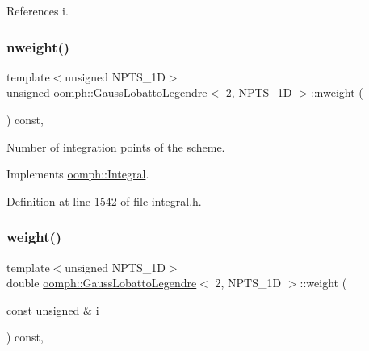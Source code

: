 References i.

\mbox{\label{classoomph_1_1GaussLobattoLegendre_3_012_00_01NPTS__1D_01_4_a1d7de3fd70cc8684195a2d7de253eb69}} 
\subsubsection{\texorpdfstring{nweight()}{nweight()}}
{\footnotesize\ttfamily template$<$unsigned N\+P\+T\+S\+\_\+1D$>$ \\
unsigned \hyperlink{classoomph_1_1GaussLobattoLegendre}{oomph\+::\+Gauss\+Lobatto\+Legendre}$<$ 2, N\+P\+T\+S\+\_\+1D $>$\+::nweight (\begin{DoxyParamCaption}{ }\end{DoxyParamCaption}) const\hspace{0.3cm}{\ttfamily [inline]}, {\ttfamily [virtual]}}



Number of integration points of the scheme. 



Implements \hyperlink{classoomph_1_1Integral_a1a270de9d99a1fcf1d25a6c1017f65fa}{oomph\+::\+Integral}.



Definition at line 1542 of file integral.\+h.

\mbox{\label{classoomph_1_1GaussLobattoLegendre_3_012_00_01NPTS__1D_01_4_a61eb3f22e13ab35f91d9439ec5382ebf}} 
\subsubsection{\texorpdfstring{weight()}{weight()}}
{\footnotesize\ttfamily template$<$unsigned N\+P\+T\+S\+\_\+1D$>$ \\
double \hyperlink{classoomph_1_1GaussLobattoLegendre}{oomph\+::\+Gauss\+Lobatto\+Legendre}$<$ 2, N\+P\+T\+S\+\_\+1D $>$\+::weight (\begin{DoxyParamCaption}\item[{const unsigned \&}]{i }\end{DoxyParamCaption}) const\hspace{0.3cm}{\ttfamily [inline]}, {\ttfamily [virtual]}}




